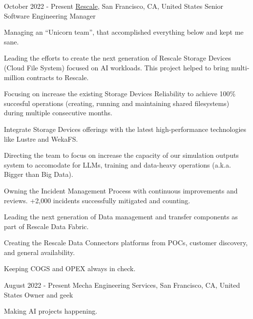 
\experience
  {October 2022 - Present}
  {\href{https://rescale.com}{Rescale}, San Francisco, CA, United States}
  {Senior Software Engineering Manager}
  {\vspace{-1em}\begin{rlist}
    \item Managing an ``Unicorn team'', that accomplished everything below and kept me sane.
    \item Leading the efforts to create the next generation of Rescale Storage Devices (Cloud File System) focused on AI workloads. This project helped
    to bring multi-million contracts to Rescale.
    \item Focusing on increase the existing Storage Devices Reliability to achieve 100\% succesful operations (creating, running and maintaining
    shared filesystems) during multiple consecutive months. 
    \item Integrate Storage Devices offerings with the latest high-performance technologies like Lustre and WekaFS.
    \item Directing the team to focus on increase the capacity of our simulation outputs system to accomodate for LLMs, training
    and data-heavy operations (a.k.a. Bigger than Big Data).
    \item Owning the Incident Management Process with continuous improvements and reviews. +2,000 incidents successfully mitigated and counting.
    \item Leading the next generation of Data management and transfer components as part of Rescale Data Fabric.
    \item Creating the Rescale Data Connectors platforms from POCs, customer discovery, and general availability.
    \item Keeping COGS and OPEX always in check.
    
  \end{rlist}}

\experience
  {August 2022 - Present}
  {Mecha Engineering Services, San Francisco, CA, United States}
  {Owner and geek}
  {\vspace{-1em}\begin{rlist}
    \item Making AI projects happening.
  \end{rlist}}


